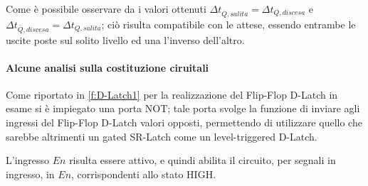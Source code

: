 	Come è possibile osservare da i valori ottenuti $\Delta t_{\overline{Q},salita} = \Delta t_{{Q},discesa}$ e $\Delta t_{\overline{Q},discesa} = \Delta t_{{Q},salita}$; ciò risulta compatibile con le attese, essendo entrambe le uscite poste sul solito livello ed una l'inverso dell'altro.
	\paragraph{Alcune analisi sulla costituzione ciruitali }
	Come riportato in \figurename{ \ref{f:D-Latch1}} per la realizzazione del Flip-Flop D-Latch in esame si è impiegato una porta NOT;
	tale porta svolge la funzione di inviare agli ingressi del Flip-Flop D-Latch valori opposti, permettendo di utilizzare quello che sarebbe altrimenti un gated SR-Latch come un level-triggered D-Latch.

	L'ingresso $En$ risulta essere attivo, e quindi abilita il circuito, per
	segnali in ingresso, in $En$, corrispondenti allo stato HIGH.
